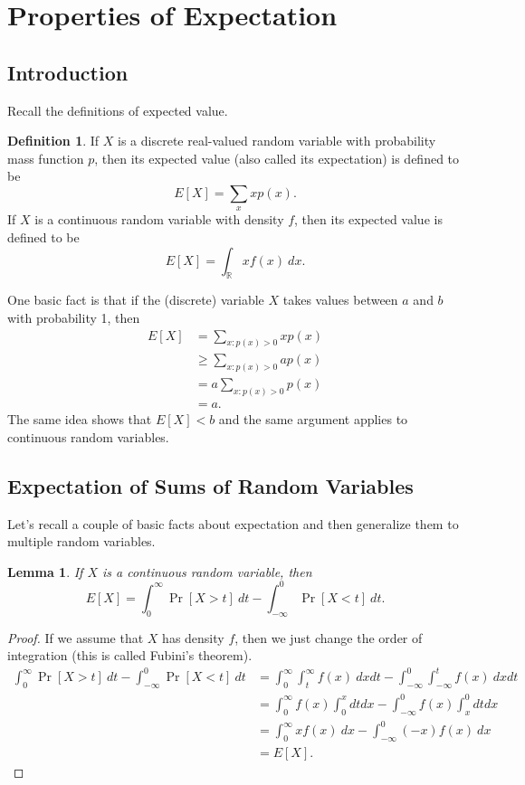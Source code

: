 \documentclass[12pt]{article}
\theoremstyle{plain}
\newtheorem{lemma}[theorem]{Lemma}
\theoremstyle{definition}
\newtheorem{definition}[theorem]{Definition}
\theoremstyle{remark}
\newcommand{\R}{\mathbb{R}}
\begin{document}
\section{Properties of Expectation}
\subsection{Introduction}
Recall the definitions of expected value.
\begin{definition}
    If $X$ is a discrete real-valued random variable with probability mass function $p$, then its expected value (also called its expectation) is defined to be
    \[
        E[X] = \sum_x x p(x).
    \]
    If $X$ is a continuous random variable with density $f$, then its expected value is defined to be
    \[
        E[X] = \int_\R x f(x)\ dx.
    \]
\end{definition}

One basic fact is that if the (discrete) variable $X$ takes values between $a$ and $b$ with probability 1, then
\begin{align*}
    E[X] &= \sum_{x: p(x)>0}x p(x)\\
    &\geq \sum_{x: p(x) > 0} ap(x)\\
    &= a\sum_{x: p(x)>0}p(x)\\
    &= a.
\end{align*}
The same idea shows that $E[X]<b$ and the same argument applies to continuous random variables.










\subsection{Expectation of Sums of Random Variables}

Let's recall a couple of basic facts about expectation and then generalize them to multiple random variables.

\begin{lemma}\label{prob integral}
    If $X$ is a continuous random variable, then
    \[
        E[X]= \int_0^\infty \Pr[X > t]\ dt - \int_{-\infty}^0 \Pr[X< t]\ dt.
    \]
\end{lemma}
\begin{proof}
    If we assume that $X$ has density $f$, then we just change the order of integration (this is called Fubini's theorem).
    \begin{align*}
        \int_0^\infty \Pr[X > t]\ dt - \int_{-\infty}^0 \Pr[X<t]\ dt &= \int_0^\infty \int_t^\infty f(x)\ dxdt - \int_{-\infty}^0 \int_{-\infty}^t f(x)\ dxdt\\
        &= \int_0^\infty f(x)\int_0^xdtdx - \int_{-\infty}^0f(x)\int_x^0dtdx\\
        &= \int_0^\infty xf(x)\ dx - \int_{-\infty}^0 (-x)f(x)\ dx\\
        &= E[X].
    \end{align*}
\end{proof}
\end{document}
